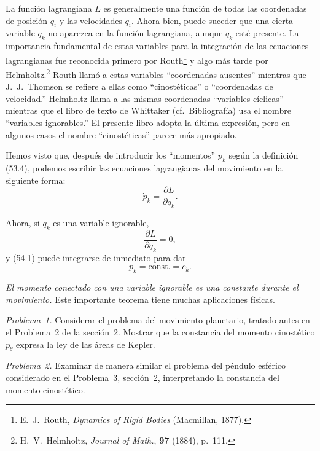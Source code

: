 \documentclass[12pt,a4paper]{book}
\begin{document}
La función lagrangiana $L$ es generalmente una función de todas las coordenadas de posición $q_i$ y las velocidades $\dot{q}_i$. Ahora bien, puede suceder que una cierta variable $q_k$ no aparezca en la función lagrangiana, aunque $\dot{q}_k$ esté presente. La importancia fundamental de estas variables para la integración de las ecuaciones lagrangianas fue reconocida primero por Routh\footnote{E.~J.~Routh, \textit{Dynamics of Rigid Bodies} (Macmillan, 1877).} y algo más tarde por Helmholtz.\footnote{H.~V.~Helmholtz, \textit{Journal of Math.}, \textbf{97} (1884), p.~111.} Routh llamó a estas variables ``coordenadas ausentes'' mientras que J.~J.~Thomson se refiere a ellas como ``cinostéticas'' o ``coordenadas de velocidad.'' Helmholtz llama a las mismas coordenadas ``variables cíclicas'' mientras que el libro de texto de Whittaker (cf.\ Bibliografía) usa el nombre ``variables ignorables.'' El presente libro adopta la última expresión, pero en algunos casos el nombre ``cinostéticas'' parece más apropiado.

Hemos visto que, después de introducir los ``momentos'' $p_k$ según la definición (53.4), podemos escribir las ecuaciones lagrangianas del movimiento en la siguiente forma:
\begin{equation}
\dot{p}_k = \frac{\partial L}{\partial q_k}. \tag{54.1}
\end{equation}

Ahora, si $q_k$ es una variable ignorable,
\begin{equation}
\frac{\partial L}{\partial q_k} = 0, \tag{54.2}
\end{equation}
y (54.1) puede integrarse de inmediato para dar
\begin{equation}
p_k = \text{const.} = c_k. \tag{54.3}
\end{equation}

\textit{El momento conectado con una variable ignorable es una constante durante el movimiento.} Este importante teorema tiene muchas aplicaciones físicas.


\textit{Problema~1.} Considerar el problema del movimiento planetario, tratado antes en el Problema~2 de la sección~2. Mostrar que la constancia del momento cinostético $p_\theta$ expresa la ley de las áreas de Kepler.

\textit{Problema~2.} Examinar de manera similar el problema del péndulo esférico considerado en el Problema~3, sección~2, interpretando la constancia del momento cinostético.
\end{document}
